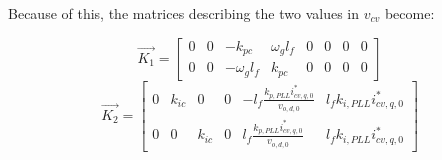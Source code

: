 Because of this, the matrices describing the two values in $v_{cv}$ become:

\begin{equation}
 \Vec{K_1} = 
 \begin{bmatrix}
 0 & 0& -k_{pc} & \omega_g l_f & 0 & 0 & 0&0\\
 0 & 0& -\omega_g l_f &k_{pc} & 0 & 0 & 0&0
 \end{bmatrix}
\end{equation}{}
\begin{equation}
\Vec{K_2} =
\begin{bmatrix}
 0&k_{ic}&0 & 0 & -l_f \frac{k_{p,PLL}i^*_{cv,q,0}}{v_{o,d,0}}&l_f k_{i,PLL}i^*_{cv,q,0}\\
 0& 0&k_{ic}&0 & l_f \frac{k_{p,PLL}i^*_{cv,q,0}}{v_{o,d,0}}&l_f k_{i,PLL}i^*_{cv,q,0}
\end{bmatrix}
\end{equation}{}


